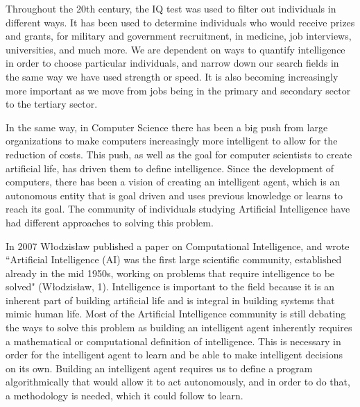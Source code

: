 \documentclass[11pt, oneside]{article}
\begin{document}
\par Throughout the 20th century, the IQ test was used to filter out individuals in different ways. It has been used to determine individuals who would receive prizes and grants, for military and government recruitment, in medicine, job interviews, universities, and much more. We are dependent on ways to quantify intelligence in order to choose particular individuals, and narrow down our search fields in the same way we have used strength or speed. It is also becoming increasingly more important as we move from jobs being in the primary and secondary sector to the tertiary sector. 

\par In the same way, in Computer Science there has been a big push from large organizations to make computers increasingly more intelligent to allow for the reduction of costs. This push, as well as the goal for computer scientists to create artificial life, has driven them to define intelligence. Since the development of computers, there has been a vision of creating an intelligent agent, which is an autonomous entity that is goal driven and uses previous knowledge or learns to reach its goal. The community of individuals studying Artificial Intelligence have had different approaches to solving this problem. 

\par In 2007 W\l{}odzis\l{}aw published a paper on Computational Intelligence, and wrote ``Artificial Intelligence (AI) was the first large scientific community, established already in the mid 1950s, working on problems that require intelligence to be solved" (W\l{}odzis\l{}aw, 1). Intelligence is important to the field because it is an inherent part of building artificial life and is integral in building systems that mimic human life. Most of the Artificial Intelligence community is still debating the ways to solve this problem as building an intelligent agent inherently requires a mathematical or computational definition of intelligence. This is necessary in order for the intelligent agent to learn and be able to make intelligent decisions on its own. Building an intelligent agent requires us to define a program algorithmically that would allow it to act autonomously, and in order to do that, a methodology is needed, which it could follow to learn.
\end{document}
